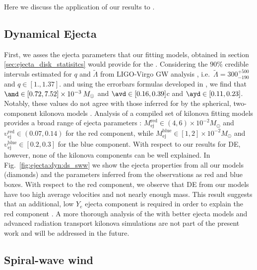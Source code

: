 
Here we discuss the application of our results to \GW{}.


\subsection{Dynamical Ejecta}


First, we asses the ejecta parameters that our fitting models, 
obtained in section \ref{sec:ejecta_disk_statisitcs} would provide for the \GW{}.
Considering the $90\%$ credible intervals estimated for $q$ and $\tilde{\Lambda}$ 
from LIGO-Virgo GW analysis
\citep{TheLIGOScientific:2017qsa,Abbott:2018wiz,De:2018uhw,Abbott:2018exr},
i.e.~$\tilde{\Lambda}=300_{-190}^{+500}$ and $q\in[1., 1.37]$. 
and using the errorbars formulas developed in \cite{Radice:2018pdn}, we find that
$\amd \in [0.72, 7.52] \times 10^{-3}\: M_{\odot}$
and
$\avd \in [0.16, 0.39]$c 
and 
$\ayd \in [0.11, 0.23]$.
Notably, these values do not agree with those inferred for \AT{} by the spherical, 
two-component kilonova models \citep{Villar:2017wcc}.
Analysis of a compiled set of kilonova fitting models provides a broad range of ejecta 
parameters \citep{Siegel:2019mlp}:
$M_{\text{ej}}^{\text{red}}\in(4, 6)\times10^{-2}M_{\odot}$ and
$\upsilon_{\text{ej}}^{\text{red}}\in(0.07, 0.14)$ for the red component, while
$M_{\text{ej}}^{\text{blue}}\in[1, 2]\times10^{-2}M_{\odot}$ and 
$\upsilon_{\text{ej}}^{\text{blue}}\in[0.2, 0.3]$ for the blue component.
With respect to our results for \ac{DE}, however, 
none of the kilonova components can be well explained.
In Fig.~\ref{fig:ejecta:dyn:ds_sww} we show the ejecta properties from
all our models (diamonds) and the parameters inferred from the
observations as red and blue boxes. 
With respect to the red component, we observe that \ac{DE} from our models 
have too high average velocities and not nearly enough mass.
This result suggests that an additional, low $Y_e$ ejecta component is required
in order to explain the \AT{} red component 
\citep{Perego:2017wtu,Kawaguchi:2018ptg,Nedora:2019jhl}.
A more thorough analysis of the \AT{} with better ejecta models and advanced
radiation transport kilonova simulations are not part of the present work 
and will be addressed in the future.


\subsection{Spiral-wave wind}


